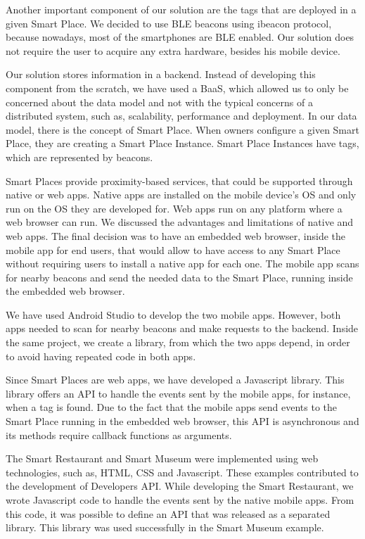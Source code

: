Another important component of our solution are the tags that are deployed in a given Smart Place.
We decided to use \gls{BLE} beacons using ibeacon protocol, because nowadays, most of the smartphones are \gls{BLE} enabled.
Our solution does not require the user to acquire any extra hardware, besides his mobile device.

Our solution stores information in a backend.
Instead of developing this component from the scratch, we have used a \gls{BaaS}, which allowed us to only be concerned about the data model and not with the typical concerns of a distributed system, such as, scalability, performance and deployment.
In our data model, there is the concept of Smart Place. When owners configure a given Smart Place, they are creating a Smart Place Instance.
Smart Place Instances have tags, which are represented by beacons.

Smart Places provide proximity-based services, that could be supported through native or web apps.
Native apps are installed on the mobile device's \gls{OS} and only run on the \gls{OS} they are developed for.
Web apps run on any platform where a web browser can run.
We discussed the advantages and limitations of native and web apps.
The final decision was to have an embedded web browser, inside the mobile app for end users, that would allow to have access to any Smart Place without requiring users to install a native app for each one.
The mobile app scans for nearby beacons and send the needed data to the Smart Place, running inside the embedded web browser.

We have used Android Studio to develop the two mobile apps.
However, both apps needed to scan for nearby beacons and make requests to the backend.
Inside the same project, we create a library, from which the two apps depend, in order to avoid having repeated code in both apps.

Since Smart Places are web apps, we have developed a Javascript library.
This library offers an \gls{API} to handle the events sent by the mobile apps, for instance, when a tag is found.
Due to the fact that the mobile apps send events to the Smart Place running in the embedded web browser, this \gls{API} is asynchronous and its methods require callback functions as arguments.

The Smart Restaurant and Smart Museum were implemented using web technologies, such as, \gls{HTML}, \gls{CSS} and Javascript.
These examples contributed to the development of Developers \gls{API}.
While developing the Smart Restaurant, we wrote Javascript code to handle the events sent by the native mobile apps.
From this code, it was possible to define an \gls{API} that was released as a separated library.
This library was used successfully in the Smart Museum example.
